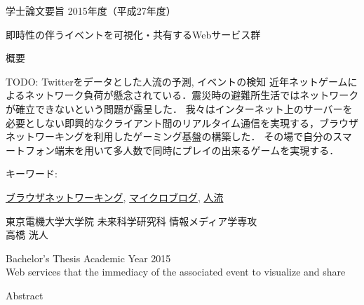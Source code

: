 \newpage
\pagestyle{plain}
\begin{center}
\LARGE{学士論文要旨 \hspace{10mm} 2015年度（平成27年度）}\\

\vspace{10mm}

\LARGE{即時性の伴うイベントを可視化・共有するWebサービス群}\\
\end{center}

\begin{center}
概要\\
\end{center}

TODO: Twitterをデータとした人流の予測, イベントの検知
 近年ネットゲームによるネットワーク負荷が懸念されている．震災時の避難所生活ではネットワークが確立できないという問題が露呈した．
我々はインターネット上のサーバーを必要としない即興的なクライアント間のリアルタイム通信を実現する，ブラウザネットワーキングを利用したゲーミング基盤の構築した．
 その場で自分のスマートフォン端末を用いて多人数で同時にプレイの出来るゲームを実現する．

\begin{flushleft}キーワード:\\
\end{flushleft}
{\underline{ブラウザネットワーキング}, \underline{マイクロブログ}, \underline{人流}}


\begin{center}
\vspace{10mm}
\begin{flushright}\large 東京電機大学大学院 未来科学研究科 情報メディア学専攻\\
\LARGE 高橋 洸人\\
\end{flushright}
\end{center}

\newpage

\begin{center}
\LARGE{Bachelor's Thesis Academic Year 2015}\\

\vspace{10mm}
\LARGE{Web services that the immediacy of the associated event to visualize and share}\\
\end{center}
\begin{center}
Abstract\\
\end{center}

